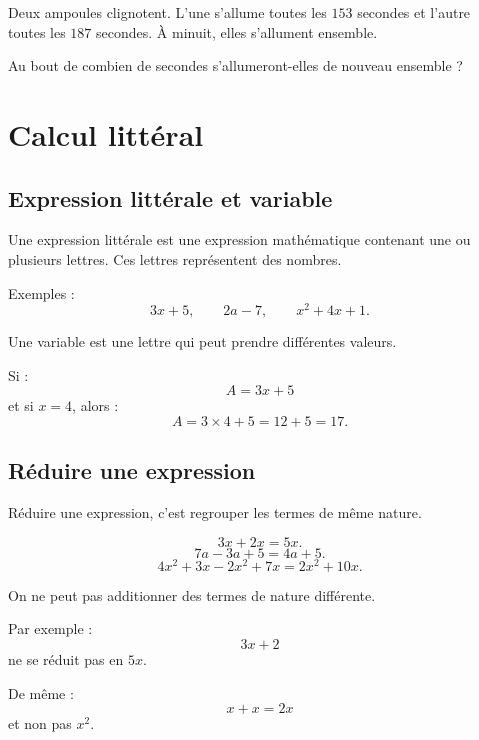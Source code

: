 \documentclass[11pt,a4paper]{article}
\newcounter{exercice}
\begin{document}
\begin{exercice}[Problème]
Deux ampoules clignotent. L'une s'allume toutes les $153$ secondes et l'autre toutes les $187$ secondes. À minuit, elles s'allument ensemble.

Au bout de combien de secondes s'allumeront-elles de nouveau ensemble ?
\end{exercice}

\newpage

\section{Calcul littéral}

\subsection{Expression littérale et variable}

\begin{definitionbox}
Une expression littérale est une expression mathématique contenant une ou plusieurs lettres. Ces lettres représentent des nombres.

Exemples :
\[
3x+5,
\qquad
2a-7,
\qquad
x^2+4x+1.
\]
\end{definitionbox}

\begin{definitionbox}
Une variable est une lettre qui peut prendre différentes valeurs.
\end{definitionbox}

\begin{exemple}
Si :
\[
A=3x+5
\]
et si $x=4$, alors :
\[
A=3\times4+5=12+5=17.
\]
\end{exemple}

\subsection{Réduire une expression}

\begin{definitionbox}
Réduire une expression, c'est regrouper les termes de même nature.
\end{definitionbox}

\begin{exemple}
\[
3x+2x=5x.
\]
\[
7a-3a+5=4a+5.
\]
\[
4x^2+3x-2x^2+7x=2x^2+10x.
\]
\end{exemple}

\begin{attention}
On ne peut pas additionner des termes de nature différente.

Par exemple :
\[
3x+2
\]
ne se réduit pas en $5x$.

De même :
\[
x+x=2x
\]
et non pas $x^2$.
\end{attention}
\end{document}
